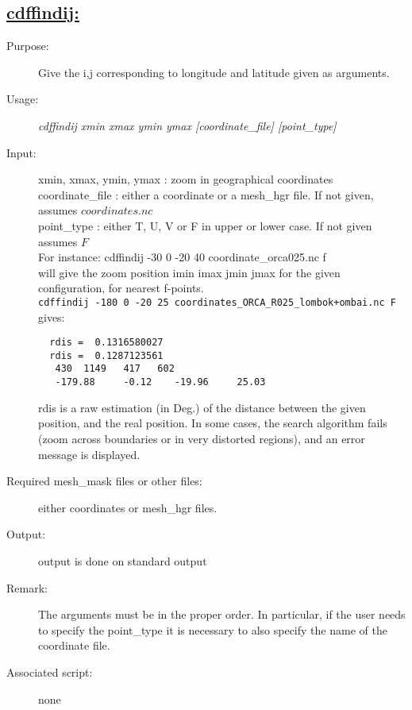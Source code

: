 \documentclass[a4paper,11pt]{article}
\begin{document}
\subsection*{\underline{cdffindij:}}
\begin{description}
\item[Purpose:] Give the i,j corresponding to longitude and latitude given as arguments.
\item[Usage:] {\em cdffindij  xmin xmax ymin ymax [coordinate\_file]  [point\_type] }
\item[Input:] xmin, xmax, ymin, ymax : zoom in geographical coordinates \\
      coordinate\_file : either a coordinate or a mesh\_hgr file. If not given, assumes $coordinates.nc$ \\
      point\_type : either T, U, V or F in upper or lower case. If not given assumes $F$ \\
For instance: cdffindij   -30 0 -20 40  coordinate\_orca025.nc f \\
will give the zoom position imin imax jmin jmax for the given configuration, for nearest f-points. \\
{\tt  cdffindij -180 0 -20 25 coordinates\_ORCA\_R025\_lombok+ombai.nc F} \\
gives:
\begin{verbatim}
  rdis =  0.1316580027
  rdis =  0.1287123561
   430  1149   417   602
   -179.88     -0.12    -19.96     25.03
\end{verbatim}
rdis is a raw estimation (in Deg.) of the distance between the given position, and the real position. In some cases,
the search algorithm fails (zoom across boundaries or in very distorted regions), and an error message is displayed.
\item[Required mesh\_mask files or other files:] either coordinates or mesh\_hgr files.
\item[Output:] output is done on standard output
\item[Remark:] The arguments must be in the proper order. In particular, if the user needs to specify the point\_type
it is necessary to also specify the name of the coordinate file.
\item[Associated script:] none
\end{description}
\end{document}
